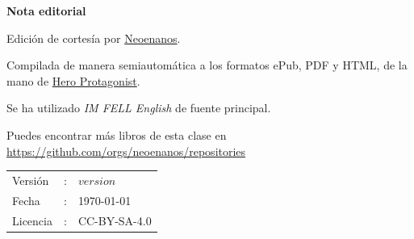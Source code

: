 \thispagestyle{empty}
\begin{center}
  {\LARGE\textbf{Nota editorial}}
\end{center}

\bigskip

Edición de cortesía por \href{https://github.com/orgs/neoenanos/}{Neoenanos}.

\medskip

Compilada de manera semiautomática a los formatos ePub, PDF y HTML, de la mano de \href{https://heroprotagonist.is-a.dev/}{Hero Protagonist}.

\medskip

Se ha utilizado {\it IM FELL English} de fuente principal.

\medskip

Puedes encontrar más libros de esta clase en\\
\url{https://github.com/orgs/neoenanos/repositories}

\vfill

\begin{tabular}{l l l}
Versión   & : & $version$ \\
Fecha     & : & \today \\
Licencia  & : & CC-BY-SA-4.0 \\
\end{tabular}

\bigskip

